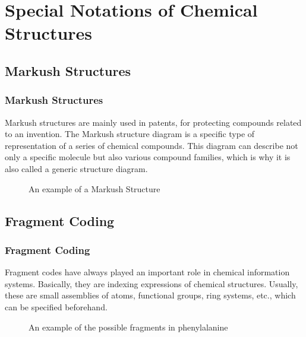 \documentclass{beamer}
\begin{document}
\section{Special Notations of Chemical Structures}
\subsection{Markush Structures}
\begin{frame}
\frametitle{Markush Structures}
Markush structures are mainly used in patents, for protecting compounds related to an invention. The Markush structure diagram is a specific type of representation of a series of chemical compounds. This diagram can describe not only a specific molecule but also various compound families, which is why it is also called a generic structure diagram.
\begin{figure}[h!]
\caption{An example of a Markush Structure \cite{gasteiger2006chemoinformatics}}
\end{figure}
\end{frame}

\subsection{Fragment Coding}
\begin{frame}
\frametitle{Fragment Coding}
Fragment codes have always played an important role in chemical information systems. Basically, they are indexing expressions of chemical structures. Usually, these are small assemblies of atoms, functional groups, ring systems, etc., which can be specified beforehand. 
\begin{figure}[h!]
\caption{An example of the possible fragments in phenylalanine \cite{gasteiger2006chemoinformatics}}
\end{figure}
\end{frame}
\end{document}
